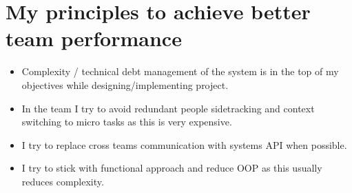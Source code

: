 \documentclass[letterpaper,11pt]{article}
\begin{document}
\section{My principles to achieve better team performance}


\begin{itemize}
 \item Complexity / technical debt management of the system is in the top of my objectives while designing/implementing project.
 \item In the team I try to avoid redundant people sidetracking and context switching to micro tasks as this is very expensive.
 \item I try to replace cross teams communication with systems API when possible.
 \item I try to stick with functional approach and reduce OOP as this usually reduces complexity.
\end{itemize}

\end{document}
